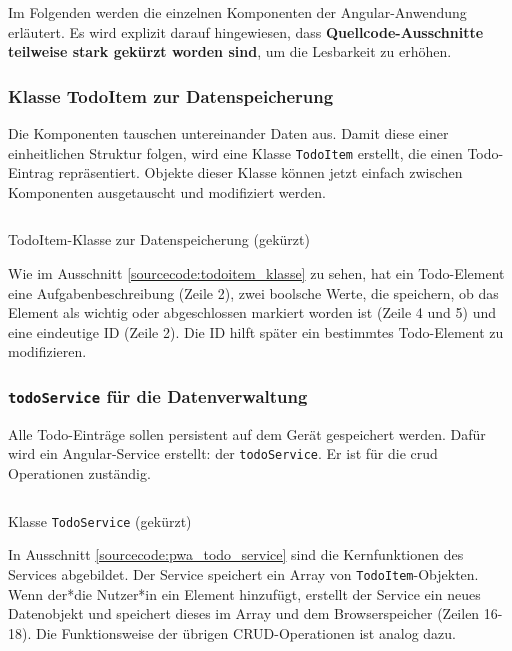 Im Folgenden werden die einzelnen Komponenten der Angular-Anwendung erläutert. Es wird explizit darauf hingewiesen, dass \textbf{Quellcode-Ausschnitte teilweise stark gekürzt worden sind}, um die Lesbarkeit zu erhöhen.

\subsubsection{Klasse TodoItem zur Datenspeicherung}

Die Komponenten tauschen untereinander Daten aus. Damit diese einer einheitlichen Struktur folgen, wird eine Klasse \texttt{TodoItem} erstellt, die einen Todo-Eintrag repräsentiert. Objekte dieser Klasse können jetzt einfach zwischen Komponenten ausgetauscht und modifiziert werden.

\begin{listing}[h]
	\inputminted{TypeScript}{sourcecode/pwa_todoitem_klasse.js}
	\caption{TodoItem-Klasse zur Datenspeicherung (gekürzt)}
	\label{sourcecode:todoitem_klasse}
\end{listing}

Wie im Ausschnitt \ref{sourcecode:todoitem_klasse} zu sehen, hat ein Todo-Element eine Aufgabenbeschreibung (Zeile 2), zwei boolsche Werte, die speichern, ob das Element als wichtig oder abgeschlossen markiert worden ist (Zeile 4 und 5) und eine eindeutige ID (Zeile 2). Die ID hilft später ein bestimmtes Todo-Element zu modifizieren.

\subsubsection{\texttt{todoService} für die Datenverwaltung}
Alle Todo-Einträge sollen persistent auf dem Gerät gespeichert werden. Dafür wird ein Angular-Service erstellt: der \texttt{todoService}. Er ist für die \acf{crud} Operationen zuständig.

\begin{listing}[h]
	\inputminted{TypeScript}{sourcecode/pwa_todo_service.ts}
	\caption{Klasse \texttt{TodoService} (gekürzt)}
	\label{sourcecode:pwa_todo_service}
\end{listing}

In Ausschnitt \ref{sourcecode:pwa_todo_service} sind die Kernfunktionen des Services abgebildet. Der Service speichert ein Array von \texttt{TodoItem}-Objekten. Wenn der*die Nutzer*in ein Element hinzufügt, erstellt der Service ein neues Datenobjekt und speichert dieses im Array und dem Browserspeicher (Zeilen 16-18). Die Funktionsweise der übrigen CRUD-Operationen ist analog dazu.

